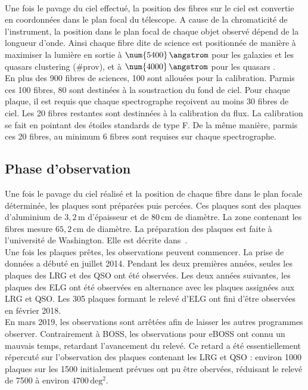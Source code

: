 \documentclass[11pt, twoside, a4paper, openright]{report}
\begin{document}
\paragraph{} Une fois le pavage du ciel effectué, la position des fibres sur le ciel est convertie en coordonnées dans le plan focal du télescope. A cause de la chromaticité de l'instrument, la position dans le plan focal de chaque objet observé dépend de la longueur d'onde. Ainsi chaque fibre dite de science est positionnée de manière à maximiser la lumière en sortie à $\num{5400}\,\angstrom$ pour les galaxies et les quasars clustering (\#prov), et à $\num{4000}\,\angstrom$ pour les quasars \lya{}. \\
En plus des \num{900} fibres de sciences, \num{100} sont allouées pour la calibration. Parmis ces \num{100} fibres, \num{80} sont destinées à la soustraction du fond de ciel. Pour chaque plaque, il est requis que chaque spectrographe reçoivent au moins \num{30} fibres de ciel. Les \num{20} fibres restantes sont destinnées à la calibration du flux. La calibration se fait en pointant des étoiles standards de type F. De la même manière, parmis ces \num{20} fibres, au minimum \num{6} fibres sont requises sur chaque spectrographe.

\subsection{Phase d'observation}

Une fois le pavage du ciel réalisé et la position de chaque fibre dans le plan focale déterminée, les plaques sont préparées puis percées. Ces plaques sont des plaques d'aluminium de $3,2\,\mathrm{m}$ d'épaisseur et de $80\,\mathrm{cm}$ de diamètre. La zone contenant les fibres mesure $65,2\,\mathrm{cm}$ de diamètre. La préparation des plaques est faite à l'université de Washington. Elle est décrite dans~\cite{Blanton2017}.\\
Une fois les plaques prêtes, les observations peuvent commencer. La prise de données a débuté en juillet 2014. Pendant les deux premières années, seules les plaques des LRG et des QSO ont été observées. Les deux années suivantes, les plaques des ELG ont été observées en alternance avec les plaques assignées aux LRG et QSO. Les \num{305} plaques formant le relevé d'ELG ont fini d'être observées en février 2018. \\
En mars 2019, les observations sont arrêtées afin de laisser les autres programmes observer. Contrairement à BOSS, les observations pour eBOSS ont connu un mauvais temps, retardant l'avancement du relevé. Ce retard a été essentiellement répercuté sur l'observation des plaques contenant les LRG et QSO : environ \num{1000} plaques sur les \num{1500} initialement prévues ont pu être obervées, réduisant le relevé de \num{7500} à environ $\num{4700}\,\mathrm{deg^{2}}$.
\end{document}
